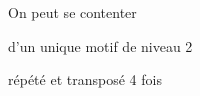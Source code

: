 \documentclass[preview]{standalone}
\begin{document}
\begin{center}
On peut se contenter 
    
  d'un unique motif de niveau 2 
  
  répété et transposé 4 fois
\end{center}
\end{document}

